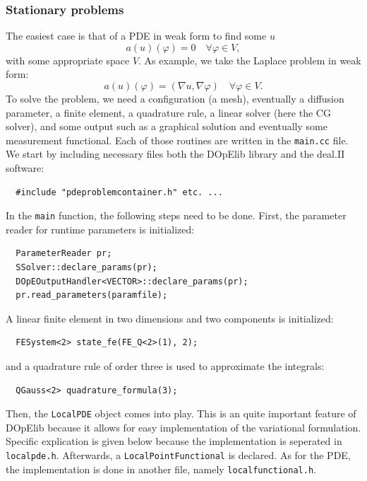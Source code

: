 \documentclass[prodmode,acmtoms]{acmsmall}
\numberwithin{equation}{section}
\renewcommand{\phi}{\varphi}
\begin{document}
\subsubsection{Stationary problems}
The easiest case 
is that of a PDE in weak form to find some $u$
\[
a(u)(\phi) = 0 \quad \forall \phi \in V,
\]
with some appropriate space $V$. As example, we take 
the Laplace problem in weak form:
\[
a(u)(\phi) = (\nabla u, \nabla \phi) \quad \forall \phi \in V.
\]
To solve the problem, we need a configuration (a mesh), eventually 
a diffusion parameter, a finite element, a quadrature rule,
a linear solver (here the CG solver), and some output such as
a graphical solution and eventually some measurement functional.
Each of those routines are written in the \texttt{main.cc} file. 
We start by including necessary files both the DOpElib library and
the deal.II software:
\begin{lstlisting}
  #include "pdeproblemcontainer.h" etc. ...
\end{lstlisting}
In the \texttt{main} function, the following steps need to be done. First, 
the parameter reader for runtime parameters is initialized:
\begin{lstlisting}
  ParameterReader pr;
  SSolver::declare_params(pr);
  DOpEOutputHandler<VECTOR>::declare_params(pr);
  pr.read_parameters(paramfile);
\end{lstlisting}
A linear finite element in two dimensions and two components is 
initialized:
\begin{lstlisting}
  FESystem<2> state_fe(FE_Q<2>(1), 2);
\end{lstlisting}
and a quadrature rule of order three is used to approximate the 
integrals:
\begin{lstlisting}
  QGauss<2> quadrature_formula(3);
\end{lstlisting}
Then, the \texttt{LocalPDE} object comes into play. This is an quite 
important feature of DOpElib because it allows for easy implementation 
of the variational formulation. Specific explication is given below because
the implementation is seperated in \texttt{localpde.h}.
Afterwards, a \texttt{LocalPointFunctional} is declared. As for the PDE, the 
implementation is done in another file, namely \texttt{localfunctional.h}.
\end{document}
